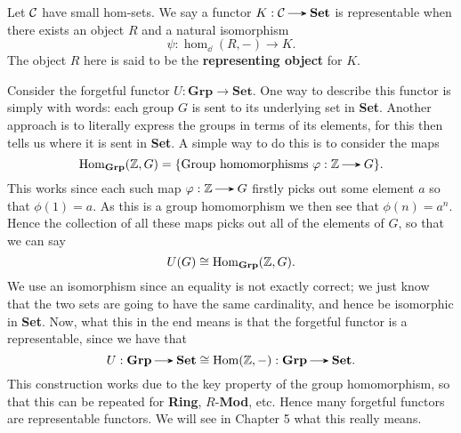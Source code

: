     \begin{definition}
        Let $\mathcal{C}$ have small hom-sets. We say a functor 
        $K: \cc \to \textbf{Set}$
        is representable when there exists an object $R$ and a natural isomorphism
        \[
            \psi: \hom_{\dd}(R, -) \to K.
        \]
        The object $R$ here is said to be the \textbf{representing object}
        for $K$. 
    \end{definition}

    \begin{example}
        Consider the forgetful functor $U: \textbf{Grp} \to \textbf{Set}$. 
        One way to describe this functor is simply with words: each group $G$ is 
        sent to its underlying set in \textbf{Set}. Another approach is to literally 
        express the groups in terms of its elements, for this then tells us where it 
        is sent in \textbf{Set}. A simple way to do this is to consider the maps 
        \[
            \hom_{\textbf{Grp}}(\zz, G) = \{\text{Group homomorphisms } \phi: \zz \to G\}.
        \]
        This works since each such map $\phi: \zz \to G$ firstly 
        picks out some element $a$ so that $\phi(1) = a$. As this is a group homomorphism 
        we then see that $\phi(n) = a^n$. Hence the collection of all these maps 
        picks out all of the elements of $G$, so that we can say
        \[
            U(G) \cong \operatorname{\mathrm{Hom}}_{\textbf{Grp}}(\mathbb{Z}, G).
        \]
        We use an isomorphism since an equality is not exactly correct; we just know that 
        the two sets are going to have the same cardinality, and hence be isomorphic in \textbf{Set}. 
        Now, what this in the end means is that the forgetful functor is a representable, 
        since we have that 
        \[
            U:\textbf{Grp} \to \textbf{Set} \cong \hom(\zz, -) : \textbf{Grp} \to \textbf{Set}.
        \]
        This construction works due to the key property of the group homomorphism, so 
        that this can be repeated for \textbf{Ring}, $R$-\textbf{Mod}, etc. Hence many forgetful functors 
        are representable functors. We will see in Chapter 5 what this really means. 
    \end{example}

